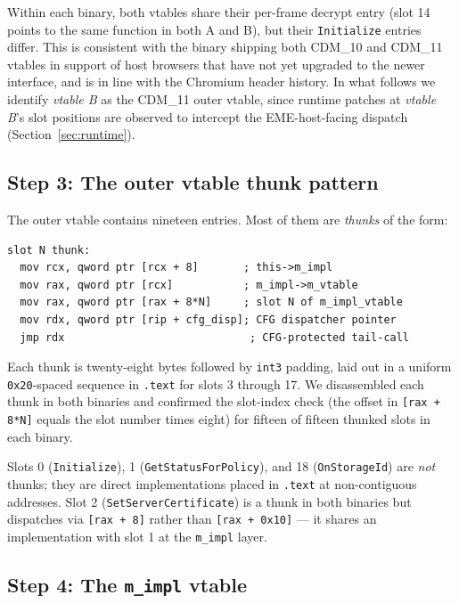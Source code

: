 \documentclass[11pt,letterpaper]{article}
\begin{document}
Within each binary, both vtables share their per-frame decrypt entry
(slot 14 points to the same function in both A and B), but their
\texttt{Initialize} entries differ.  This is consistent with the
binary shipping both CDM\_10 and CDM\_11 vtables in support of host
browsers that have not yet upgraded to the newer interface, and is
in line with the Chromium header history.  In what follows we
identify \emph{vtable B} as the CDM\_11 outer vtable, since runtime
patches at \emph{vtable B}'s slot positions are observed to intercept
the EME-host-facing dispatch (Section~\ref{sec:runtime}).

\subsection{Step 3: The outer vtable thunk pattern}
\label{sec:static-thunk}

The outer vtable contains nineteen entries.  Most of them are
\emph{thunks} of the form:

\begin{lstlisting}[basicstyle=\ttfamily\scriptsize]
slot N thunk:
  mov rcx, qword ptr [rcx + 8]       ; this->m_impl
  mov rax, qword ptr [rcx]           ; m_impl->m_vtable
  mov rax, qword ptr [rax + 8*N]     ; slot N of m_impl_vtable
  mov rdx, qword ptr [rip + cfg_disp]; CFG dispatcher pointer
  jmp rdx                             ; CFG-protected tail-call
\end{lstlisting}

Each thunk is twenty-eight bytes followed by \texttt{int3} padding,
laid out in a uniform \texttt{0x20}-spaced sequence in \texttt{.text}
for slots 3 through 17.  We disassembled each thunk in both binaries
and confirmed the slot-index check (the offset in
\texttt{[rax + 8*N]} equals the slot number times eight) for fifteen
of fifteen thunked slots in each binary.

Slots 0 (\texttt{Initialize}), 1 (\texttt{GetStatusForPolicy}), and
18 (\texttt{OnStorageId}) are \emph{not} thunks; they are direct
implementations placed in \texttt{.text} at non-contiguous addresses.
Slot 2 (\texttt{SetServerCertificate}) is a thunk in both binaries
but dispatches via \texttt{[rax + 8]} rather than
\texttt{[rax + 0x10]} --- it shares an implementation with slot 1 at
the \texttt{m\_impl} layer.

\subsection{Step 4: The \texttt{m\_impl} vtable}
\label{sec:static-mimpl}
\end{document}
